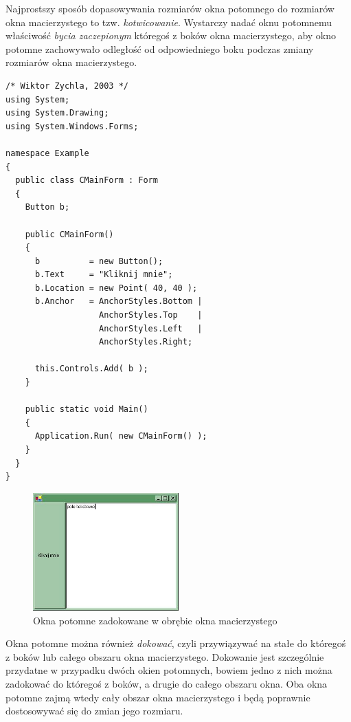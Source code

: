 Najprostszy sposób dopasowywania rozmiarów okna potomnego do rozmiarów okna 
macierzystego to tzw. {\em kotwicowanie}. Wystarczy nadać oknu potomnemu właściwość 
{\em bycia zaczepionym} któregoś z boków okna macierzystego, aby okno potomne zachowywało odległość
od odpowiedniego boku podczas zmiany rozmiarów okna macierzystego.

\begin{scriptsize}
\begin{verbatim}
/* Wiktor Zychla, 2003 */
using System;
using System.Drawing;
using System.Windows.Forms;

namespace Example
{
  public class CMainForm : Form
  {   
    Button b; 

    public CMainForm()
    {
      b          = new Button();
      b.Text     = "Kliknij mnie";
      b.Location = new Point( 40, 40 );
      b.Anchor   = AnchorStyles.Bottom |
                   AnchorStyles.Top    |
                   AnchorStyles.Left   |
                   AnchorStyles.Right;

      this.Controls.Add( b );
    } 

    public static void Main()
    {
      Application.Run( new CMainForm() );
    }
  }
}
\end{verbatim}
\end{scriptsize}

\begin{figure}
\begin{center}
\includegraphics[width=0.50\textwidth]{./pic/swf02}
\caption{Okna potomne zadokowane w obrębie okna macierzystego}
\end{center}
\end{figure}

Okna potomne można również {\em dokować}, czyli przywiązywać na stałe do któregoś z boków lub całego obszaru 
okna macierzystego. Dokowanie jest szczególnie przydatne w przypadku dwóch okien potomnych, bowiem jedno z nich
można zadokować do któregoś z boków, a drugie do całego obszaru okna. Oba okna potomne zajmą wtedy
cały obszar okna macierzystego i będą poprawnie dostosowywać się do zmian jego rozmiaru.

